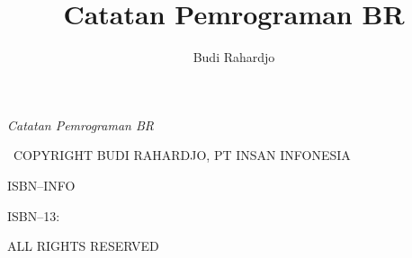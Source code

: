 \documentclass[10pt,twoside,openright]{memoir}
\author{Budi Rahardjo}
\title{Catatan Pemrograman BR}
\date{}
\makeatletter
\def\maketitle{%
  \null
  \thispagestyle{empty}%
  \vfill
  \begin{center}\leavevmode
    \normalfont
    {\LARGE\raggedleft \@author\par}%
    \hrulefill\par
    {\huge\raggedright \@title\par}%
    \vskip 1cm
  \end{center}%
  \vfill
  \null
  \cleardoublepage
  }
\makeatother
\begin{document}
\let\cleardoublepage\clearpage


\maketitle






\frontmatter

\null\vfill

\begin{flushleft}
\textit{Catatan Pemrograman BR}


\textcopyright ~COPYRIGHT BUDI RAHARDJO, PT INSAN INFONESIA


ISBN--INFO

ISBN--13: 
\bigskip





ALL RIGHTS RESERVED




\end{flushleft}
\let\cleardoublepage\clearpage

\mainmatter
\sloppy




\end{document}
